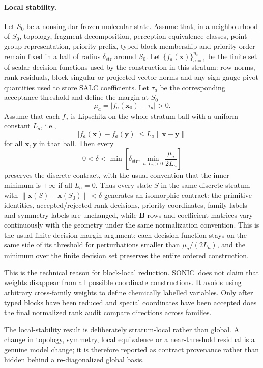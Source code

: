 \documentclass[journal=jctcce,manuscript=article,layout=traditional]{achemso}
\newcommand{\SONIC}{SONIC}
\newcommand{\Bmat}{\mathbf{B}}
\newcommand{\x}{\mathbf{x}}
\newcommand{\y}{\mathbf{y}}
\theoremstyle{definition}
\begin{document}
\paragraph{Local stability.}
\label{thm:local-stability}
Let \(S_0\) be a nonsingular frozen molecular state.  Assume that, in a
neighbourhood of \(S_0\), topology, fragment decomposition, perception equivalence
classes, point-group representation, priority prefix, typed block
membership and priority order remain fixed in a ball of radius
\(\delta_{\mathrm{str}}\) around \(S_0\).  Let
\(\{f_a(\x)\}_{a=1}^{n_t}\) be the finite set of scalar decision functions used
by the construction in this stratum: row norms, rank residuals, block singular
or projected-vector norms and any sign-gauge pivot quantities used to store
SALC coefficients.  Let \(\tau_a\) be the corresponding acceptance threshold and
define the margin at \(S_0\)
\[
  \mu_a = |f_a(\x_0)-\tau_a| > 0 .
\]
Assume that each \(f_a\) is Lipschitz on the whole stratum ball with a uniform
constant \(L_a\), i.e.,
\[
  |f_a(\x)-f_a(\y)| \le L_a\|\x-\y\|
\]
for all \(\x,\y\) in that ball.  Then every
\[
  0 < \delta <
  \min\left[
    \delta_{\mathrm{str}},
    \min_{a:L_a>0}\frac{\mu_a}{2L_a}
  \right]
\]
preserves the discrete contract, with the usual convention that the
inner minimum is \(+\infty\) if all \(L_a=0\).  Thus every state \(S\) in the
same discrete stratum with \(\|\x(S)-\x(S_0)\|<\delta\) generates an isomorphic
contract: the primitive identities, accepted/rejected rank decisions,
priority coordinates, family labels and symmetry labels are unchanged, while
\(\Bmat\) rows and coefficient matrices vary continuously with the geometry
under the same normalization convention.
This is the usual finite-decision margin argument: each decision function stays
on the same side of its threshold for perturbations smaller than
\(\mu_a/(2L_a)\), and the minimum over the finite decision set preserves the
entire ordered construction.

This is the technical reason for block-local reduction.  \SONIC\ does not claim
that weights disappear from all possible coordinate constructions.  It avoids
using arbitrary cross-family weights to define chemically labelled variables.
Only after typed blocks have been reduced and special coordinates have
been accepted does the final normalized rank audit compare directions across
families.

The local-stability result is deliberately stratum-local rather than global.  A
change in topology, symmetry, local equivalence or a near-threshold residual is
a genuine model change; it is therefore reported as contract provenance rather
than hidden behind a re-diagonalized global basis.
\end{document}
